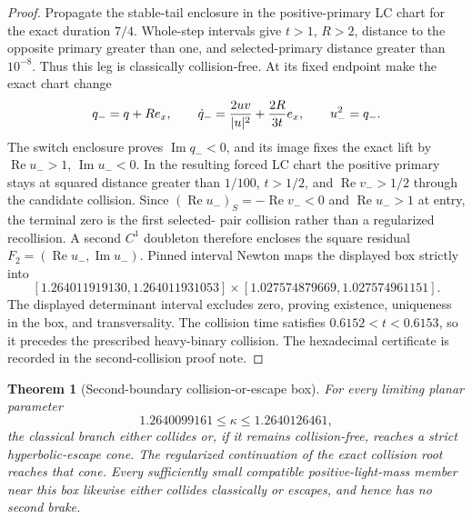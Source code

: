 \documentclass[11pt]{article}
\newtheorem{theorem}{Theorem}
\begin{document}
\begin{proof}
Propagate the stable-tail enclosure in the positive-primary LC chart for the
exact duration $7/4$.  Whole-step intervals give $t>1$, $R>2$, distance to
the opposite primary greater than one, and selected-primary distance greater
than $10^{-8}$.  Thus this leg is classically collision-free.  At its fixed
endpoint make the exact chart change
\[
 q_-=q+R e_x,
 \qquad
 \dot q_-={2uv\over|u|^2}+{2R\over3t}e_x,
 \qquad u_-^2=q_-.
\]
The switch enclosure proves $\operatorname{Im}q_-<0$, and its image fixes the
exact lift by $\operatorname{Re}u_->1$, $\operatorname{Im}u_-<0$.  In the resulting forced
LC chart the positive primary stays at squared distance greater than $1/100$,
$t>1/2$, and $\operatorname{Re}v_->1/2$ through the candidate collision.
Since $(\operatorname{Re}u_-)_{S}=-\operatorname{Re}v_-<0$ and
$\operatorname{Re}u_->1$ at entry, the terminal zero is the first selected-
pair collision rather than a regularized recollision.  A second $C^1$ doubleton
therefore encloses the square residual
$F_2=(\operatorname{Re}u_-,\operatorname{Im}u_-)$.  Pinned interval Newton
maps the displayed box strictly into
\[
 [1.264011919130,1.264011931053]
 \times[1.027574879669,1.027574961151].
\]
The displayed determinant interval excludes zero, proving existence,
uniqueness in the box, and transversality.  The collision time satisfies
$0.6152<t<0.6153$, so it precedes the prescribed heavy-binary collision.
The hexadecimal certificate is recorded in the second-collision proof note.
\end{proof}

\begin{theorem}[Second-boundary collision-or-escape box]
For every limiting planar parameter
\[
 1.2640099161\le\kappa\le1.2640126461,
\]
the classical branch either collides or, if it remains collision-free,
reaches a strict hyperbolic-escape cone.  The regularized continuation of the
exact collision root reaches that cone.  Every sufficiently small compatible
positive-light-mass member near this box likewise either collides classically
or escapes, and hence has no second brake.
\end{theorem}
\end{document}
